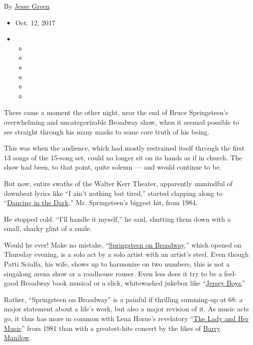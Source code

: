 By \href{http://www.nytimes3xbfgragh.onion/by/jesse-green}{Jesse Green}

\begin{itemize}
\item
  Oct. 12, 2017
\item
  \begin{itemize}
  \item
  \item
  \item
  \item
  \item
  \item
  \end{itemize}
\end{itemize}

There came a moment the other night, near the end of Bruce Springsteen's
overwhelming and uncategorizable Broadway show, when it seemed possible
to see straight through his many masks to some core truth of his being.

This was when the audience, which had mostly restrained itself through
the first 13 songs of the 15-song set, could no longer sit on its hands
as if in church. The show had been, to that point, quite solemn --- and
would continue to be.

But now, entire swaths of the Walter Kerr Theater, apparently unmindful
of downbeat lyrics like ``I ain't nothing but tired,'' started clapping
along to ``\href{https://www.youtube.com/watch?v=129kuDCQtHs}{Dancing in
the Dark},'' Mr. Springsteen's biggest hit, from 1984.

He stopped cold. ``I'll handle it myself,'' he said, shutting them down
with a small, sharky glint of a smile.

Would he ever! Make no mistake,
``\href{https://brucespringsteen.net/broadway/}{Springsteen on
Broadway},'' which opened on Thursday evening, is a solo act by a solo
artist with an artist's steel. Even though Patti Scialfa, his wife,
shows up to harmonize on two numbers, this is not a singalong arena show
or a roadhouse rouser. Even less does it try to be a feel-good Broadway
book musical or a slick, whitewashed jukebox like
``\href{http://www.nytimes3xbfgragh.onion/2005/11/07/theater/reviews/from-bluecollar-boys-to-doowop-sensation-a-bands-rise-and-fall.html}{Jersey
Boys.}''

Rather, ``Springsteen on Broadway'' is a painful if thrilling summing-up
at 68: a major statement about a life's work, but also a major revision
of it. As music acts go, it thus has more in common with Lena Horne's
revelatory
``\href{http://www.nytimes3xbfgragh.onion/1981/05/13/arts/theater-lena-horne-the-lady-and-her-music.html}{The
Lady and Her Music}'' from 1981 than with a greatest-hits concert by the
likes of
\href{https://www.timeout.com/newyork/theater/manilow-on-broadway-st-james-theatre-february-19-2013}{Barry
Manilow}.

